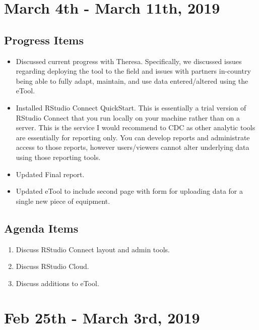 \documentclass[]{article}
\providecommand{\tightlist}{%
  \setlength{\itemsep}{0pt}\setlength{\parskip}{0pt}}
\begin{document}
\hypertarget{march-4th---march-11th-2019}{%
\section{March 4th - March 11th,
2019}\label{march-4th---march-11th-2019}}

\hypertarget{progress-items-4}{%
\subsection{Progress Items}\label{progress-items-4}}

\begin{itemize}
\tightlist
\item
  Discussed current progress with Theresa. Specifically, we discussed
  issues regarding deploying the tool to the field and issues with
  partners in-country being able to fully adapt, maintain, and use data
  entered/altered using the eTool.
\item
  Installed RStudio Connect QuickStart. This is essentially a trial
  version of RStudio Connect that you run locally on your machine rather
  than on a server. This is the service I would recommend to CDC as
  other analytic tools are essentially for reporting only. You can
  develop reports and administrate access to those reports, however
  users/viewers cannot alter underlying data using those reporting
  tools.
\item
  Updated Final report.
\item
  Updated eTool to include second page with form for uploading data for
  a single new piece of equipment.
\end{itemize}

\hypertarget{agenda-items-4}{%
\subsection{Agenda Items}\label{agenda-items-4}}

\begin{enumerate}
\def\labelenumi{\arabic{enumi}.}
\tightlist
\item
  Discuss RStudio Connect layout and admin tools.
\item
  Discuss RStudio Cloud.
\item
  Discuss additions to eTool.
\end{enumerate}

\hypertarget{feb-25th---march-3rd-2019}{%
\section{Feb 25th - March 3rd, 2019}\label{feb-25th---march-3rd-2019}}
\end{document}
